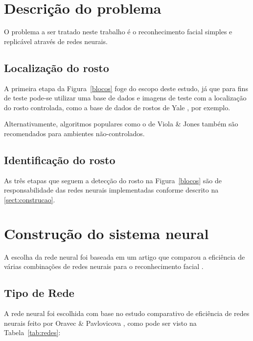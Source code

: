 \documentclass[hidelinks,11pt,twocolumn]{article}
\begin{document}
\section{Descrição do problema}

O problema a ser tratado neste trabalho é o reconhecimento facial simples e replicável através de redes neurais.

\subsection{Localização do rosto}

A primeira etapa da Figura~\ref{blocos} foge do escopo deste estudo, já que para fins de teste pode-se utilizar uma base de dados e imagens de teste com a localização do rosto controlada, como a base de dados de rostos de Yale \cite{yale}, por exemplo. 

Alternativamente, algoritmos populares como o de Viola \& Jones \cite{viola-jones} também são recomendados para ambientes não-controlados.

\subsection{Identificação do rosto}

As três etapas que seguem a detecção do rosto na Figura~\ref{blocos} são de responsabilidade das redes neurais implementadas conforme descrito na \autoref{sect:construcao}.

\section{Construção do sistema neural}
\label{sect:construcao}

A escolha da rede neural foi baseada em um artigo que comparou a eficiência de várias combinações de redes neurais para o reconhecimento facial \cite{oravec}.


\subsection{Tipo de Rede}

A rede neural foi escolhida com base no estudo comparativo de eficiência de redes neurais feito por Oravec \& Pavlovicova \cite{oravec}, como pode ser visto na Tabela~\ref{tab:redes}:
\end{document}
